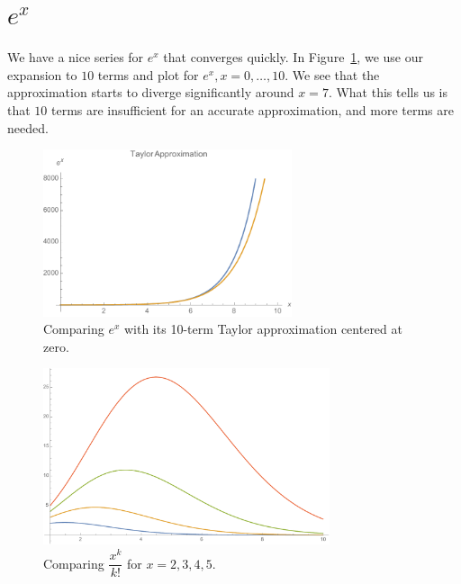 \section{\LARGE $e^x$}\label{section:exp}

We have a nice series for $e^x$ that converges quickly. In
Figure~\ref{figure:exp}, we use our expansion to $10$ terms and plot for
$e^x, x=0,\ldots,{10}$. We see that the approximation starts to diverge
significantly around $x = 7$. What this tells us is that $10$ terms are
insufficient for an accurate approximation, and more terms are needed.

\begin{figure}[bth]
  \begin{centering}
    \includegraphics[width=0.65\textwidth]{images/exp.pdf}
    \caption{Comparing $e^x$ with its 10-term Taylor approximation
    centered at zero.}\label{figure:exp}
  \end{centering}
\end{figure}

\begin{figure}[bth]
  \begin{centering}
    \includegraphics[width=0.75\textwidth]{images/growth.pdf}
    \caption{Comparing $\dfrac{x^k}{k!}$ for $x=2,3,4,5$.}\label{figure:growth}
  \end{centering}
\end{figure}

